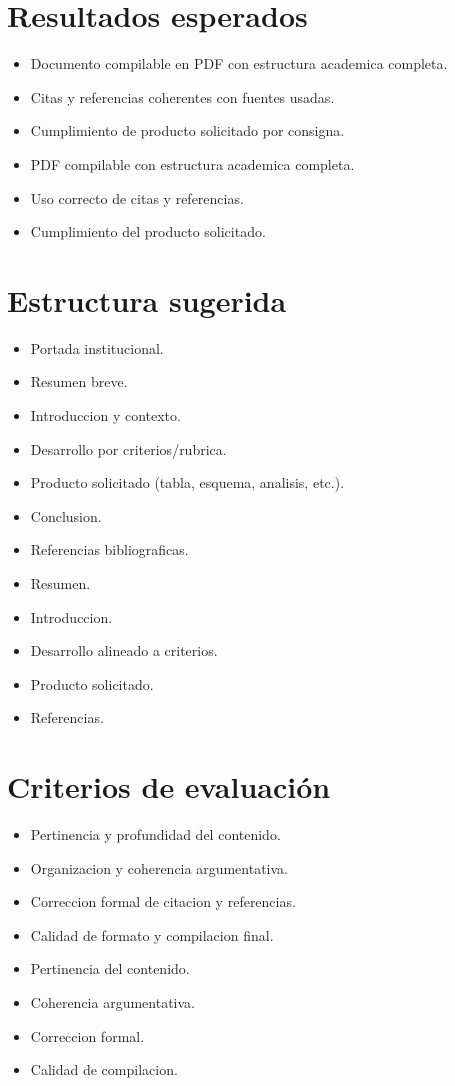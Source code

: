 \documentclass[12pt]{article}
\begin{document}
\section*{Resultados esperados}
\begin{itemize}[leftmargin=*]
  \item Documento compilable en PDF con estructura academica completa.
  \item Citas y referencias coherentes con fuentes usadas.
  \item Cumplimiento de producto solicitado por consigna.
  \item PDF compilable con estructura academica completa.
  \item Uso correcto de citas y referencias.
  \item Cumplimiento del producto solicitado.
\end{itemize}

\section*{Estructura sugerida}
\begin{itemize}[leftmargin=*]
  \item Portada institucional.
  \item Resumen breve.
  \item Introduccion y contexto.
  \item Desarrollo por criterios/rubrica.
  \item Producto solicitado (tabla, esquema, analisis, etc.).
  \item Conclusion.
  \item Referencias bibliograficas.
  \item Resumen.
  \item Introduccion.
  \item Desarrollo alineado a criterios.
  \item Producto solicitado.
  \item Referencias.
\end{itemize}

\section*{Criterios de evaluación}
\begin{itemize}[leftmargin=*]
  \item Pertinencia y profundidad del contenido.
  \item Organizacion y coherencia argumentativa.
  \item Correccion formal de citacion y referencias.
  \item Calidad de formato y compilacion final.
  \item Pertinencia del contenido.
  \item Coherencia argumentativa.
  \item Correccion formal.
  \item Calidad de compilacion.
\end{itemize}
\end{document}
